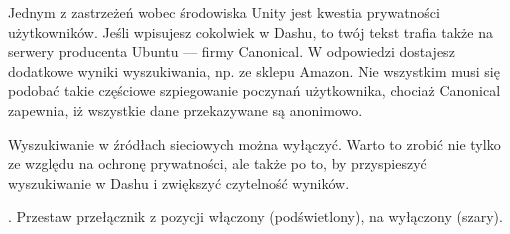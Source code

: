 Jednym z zastrzeżeń wobec środowiska Unity jest kwestia prywatności użytkowników. Jeśli wpisujesz cokolwiek w Dashu, to twój tekst trafia także na serwery producenta Ubuntu --- firmy Canonical. W odpowiedzi dostajesz dodatkowe wyniki wyszukiwania, np. ze sklepu Amazon. Nie wszystkim musi się podobać takie częściowe szpiegowanie poczynań użytkownika, chociaż Canonical zapewnia, iż wszystkie dane przekazywane są anonimowo.

Wyszukiwanie w źródłach sieciowych można wyłączyć. Warto to zrobić nie tylko ze względu na ochronę prywatności, ale także po to, by przyspieszyć wyszukiwanie w Dashu i zwiększyć czytelność wyników.

\noindent {}. Przestaw przełącznik z pozycji włączony (podświetlony), na wyłączony (szary).

